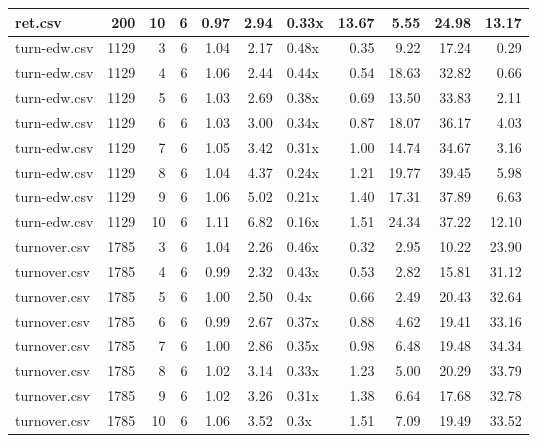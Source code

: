 \begin{table}[ht]
\begin{tabular}{lrrrrrlrrrr}
   \hline
ret.csv & 200 &  10 &   6 & 0.97 & 2.94 & 0.33x & 13.67 & 5.55 & 24.98 & 13.17 \\ 
   \hline
turn-edw.csv & 1129 &   3 &   6 & 1.04 & 2.17 & 0.48x & 0.35 & 9.22 & 17.24 & 0.29 \\ 
   \hline
turn-edw.csv & 1129 &   4 &   6 & 1.06 & 2.44 & 0.44x & 0.54 & 18.63 & 32.82 & 0.66 \\ 
   \hline
turn-edw.csv & 1129 &   5 &   6 & 1.03 & 2.69 & 0.38x & 0.69 & 13.50 & 33.83 & 2.11 \\ 
   \hline
turn-edw.csv & 1129 &   6 &   6 & 1.03 & 3.00 & 0.34x & 0.87 & 18.07 & 36.17 & 4.03 \\ 
   \hline
turn-edw.csv & 1129 &   7 &   6 & 1.05 & 3.42 & 0.31x & 1.00 & 14.74 & 34.67 & 3.16 \\ 
   \hline
turn-edw.csv & 1129 &   8 &   6 & 1.04 & 4.37 & 0.24x & 1.21 & 19.77 & 39.45 & 5.98 \\ 
   \hline
turn-edw.csv & 1129 &   9 &   6 & 1.06 & 5.02 & 0.21x & 1.40 & 17.31 & 37.89 & 6.63 \\ 
   \hline
turn-edw.csv & 1129 &  10 &   6 & 1.11 & 6.82 & 0.16x & 1.51 & 24.34 & 37.22 & 12.10 \\ 
   \hline
turnover.csv & 1785 &   3 &   6 & 1.04 & 2.26 & 0.46x & 0.32 & 2.95 & 10.22 & 23.90 \\ 
   \hline
turnover.csv & 1785 &   4 &   6 & 0.99 & 2.32 & 0.43x & 0.53 & 2.82 & 15.81 & 31.12 \\ 
   \hline
turnover.csv & 1785 &   5 &   6 & 1.00 & 2.50 & 0.4x & 0.66 & 2.49 & 20.43 & 32.64 \\ 
   \hline
turnover.csv & 1785 &   6 &   6 & 0.99 & 2.67 & 0.37x & 0.88 & 4.62 & 19.41 & 33.16 \\ 
   \hline
turnover.csv & 1785 &   7 &   6 & 1.00 & 2.86 & 0.35x & 0.98 & 6.48 & 19.48 & 34.34 \\ 
   \hline
turnover.csv & 1785 &   8 &   6 & 1.02 & 3.14 & 0.33x & 1.23 & 5.00 & 20.29 & 33.79 \\ 
   \hline
turnover.csv & 1785 &   9 &   6 & 1.02 & 3.26 & 0.31x & 1.38 & 6.64 & 17.68 & 32.78 \\ 
   \hline
turnover.csv & 1785 &  10 &   6 & 1.06 & 3.52 & 0.3x & 1.51 & 7.09 & 19.49 & 33.52 \\ 
   \hline
\end{tabular}
\end{table}
